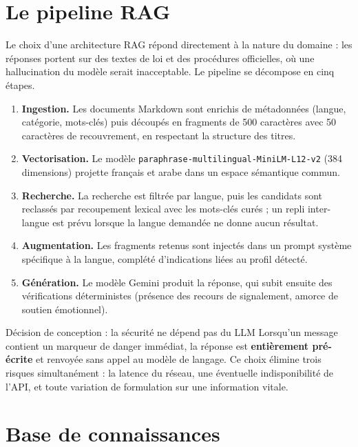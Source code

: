 \documentclass[a4paper,11pt,twoside]{report}
\begin{document}
\section{Le pipeline RAG}

Le choix d'une architecture RAG répond directement à la nature du domaine : les
réponses portent sur des textes de loi et des procédures officielles, où une
hallucination du modèle serait inacceptable. Le pipeline se décompose en cinq
étapes.

\begin{enumerate}[itemsep=2pt]
  \item \textbf{Ingestion.} Les documents Markdown sont enrichis de métadonnées
  (langue, catégorie, mots-clés) puis découpés en fragments de 500 caractères
  avec 50 caractères de recouvrement, en respectant la structure des titres.
  \item \textbf{Vectorisation.} Le modèle
  \texttt{paraphrase-multilingual-MiniLM-L12-v2} (384 dimensions) projette
  français et arabe dans un espace sémantique commun.
  \item \textbf{Recherche.} La recherche est filtrée par langue, puis les
  candidats sont reclassés par recoupement lexical avec les mots-clés
  curés ; un repli inter-langue est prévu lorsque la langue demandée ne donne
  aucun résultat.
  \item \textbf{Augmentation.} Les fragments retenus sont injectés dans un
  prompt système spécifique à la langue, complété d'indications liées au profil
  détecté.
  \item \textbf{Génération.} Le modèle Gemini produit la réponse, qui subit
  ensuite des vérifications déterministes (présence des recours de signalement,
  amorce de soutien émotionnel).
\end{enumerate}

\begin{infobox}{Décision de conception : la sécurité ne dépend pas du LLM}
Lorsqu'un message contient un marqueur de danger immédiat, la réponse est
\textbf{entièrement pré-écrite} et renvoyée sans appel au modèle de langage.
Ce choix élimine trois risques simultanément : la latence du réseau, une
éventuelle indisponibilité de l'API, et toute variation de formulation sur une
information vitale.
\end{infobox}

\section{Base de connaissances}
\end{document}
